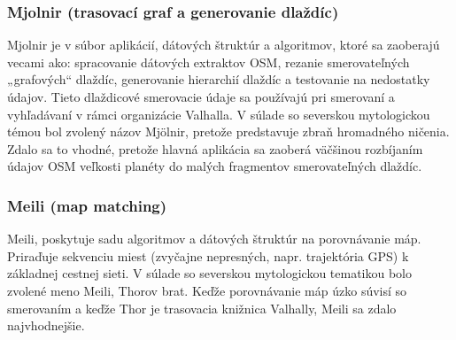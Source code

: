 \subsubsection{Mjolnir (trasovací graf a generovanie dlaždíc)}
Mjolnir je v súbor aplikácií, dátových štruktúr a algoritmov, ktoré sa zaoberajú vecami ako: spracovanie dátových extraktov OSM, rezanie smerovateľných „grafových“ dlaždíc, generovanie hierarchií dlaždíc a testovanie na nedostatky údajov. Tieto dlaždicové smerovacie údaje sa používajú pri smerovaní a vyhľadávaní v rámci organizácie Valhalla. V súlade so severskou mytologickou témou bol zvolený názov Mjölnir, pretože predstavuje zbraň hromadného ničenia. Zdalo sa to vhodné, pretože hlavná aplikácia sa zaoberá väčšinou rozbíjaním údajov OSM veľkosti planéty do malých fragmentov smerovateľných dlaždíc. %
\subsubsection{Meili (map matching)}  %
Meili, poskytuje sadu algoritmov a dátových štruktúr na porovnávanie máp. Priraďuje sekvenciu miest (zvyčajne nepresných, napr. trajektória GPS) k základnej cestnej sieti. V súlade so severskou mytologickou tematikou bolo zvolené meno Meili, Thorov brat. Keďže porovnávanie máp úzko súvisí so smerovaním a keďže Thor je trasovacia knižnica Valhally, Meili sa zdalo najvhodnejšie.


